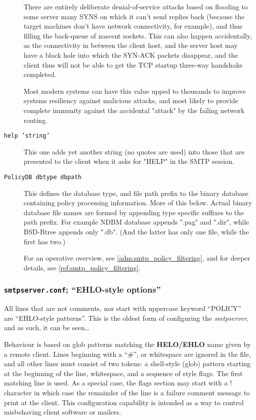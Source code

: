 \begin{description}
There are entirely deliberate denial-of-service attacks based on
flooding to some server many SYNS on which it can't send replies
back (because the target machines don't have network connectivity,
for example), and thus filling the back-queue of nascent sockets.
This can also happen accidentally, as the connectivity in between
the client host, and the server host may have a black hole into
which the SYN-ACK packets disappear, and the client thus will not
be able to get the TCP startup three-way handshake completed.

Most modern systems can have this value upped to thousands to
improve systems resiliency against malicious attacks, and most
likely to provide complete immunity against the accidental
"attack" by the failing network routing.



\item[{\tt help 'string'}] \mbox{}

This one adds yet another string (no quotes are used) into those
that are presented to the client when it asks for "HELP" in the
SMTP session.



\item[{\tt PolicyDB dbtype dbpath}] \mbox{}

This defines the database type, and file path prefix to the binary
database containing policy processing information.  More of this
below.  Actual binary database file names are formed by appending
type specific suffixes to the path prefix.  For example NDBM
database appends ".pag" and ".dir", while BSD-Btree appends only
".db".  (And the latter has only one file, while the first has two.)

For an operative overview, see  \vref{adm:smtp_policy_filtering}, and
for deeper details, see \vref{ref:smtp_policy_filtering}.

\end{description}


\subsubsection{{\tt smtpserver.conf}; ``EHLO-style options''}

All lines that are not comments, nor start with uppercase keyword
``POLICY'' are ``EHLO-style patterns''.
This is the oldest form of configuring the {\em smtpserver}, and
as such, it can be seen\ldots


Behaviour is based on glob patterns matching the {\bf HELO/EHLO} name
given by a remote client.
Lines beginning with a ``\#'', or whitespace are ignored in the file,
and all other lines must consist of two tokens: a shell-style (glob) 
pattern starting at the beginning of the line, whitespace, and a 
sequence of style flags. The first matching line is used. As a 
special case, the flags section may start with a ! character in 
which case the remainder of the line is a failure comment message 
to print at the client. This configuration capability is intended 
as a way to control misbehaving client software or mailers.






